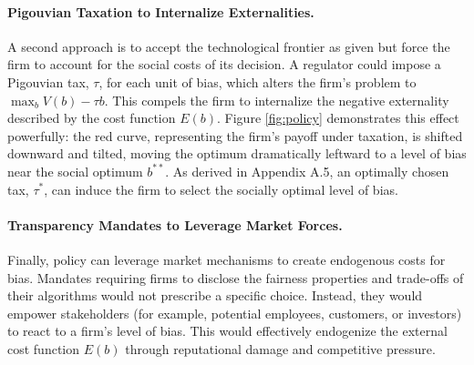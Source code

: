 \paragraph{Pigouvian Taxation to Internalize Externalities.}
A second approach is to accept the technological frontier as given but force the firm to account for the social costs of its decision. A regulator could impose a Pigouvian tax, $\tau$, for each unit of bias, which alters the firm's problem to $\max_b V(b) - \tau b$. This compels the firm to internalize the negative externality described by the cost function $E(b)$. Figure \ref{fig:policy} demonstrates this effect powerfully: the red curve, representing the firm's payoff under taxation, is shifted downward and tilted, moving the optimum dramatically leftward to a level of bias near the social optimum $b^{**}$. As derived in Appendix A.5, an optimally chosen tax, $\tau^*$, can induce the firm to select the socially optimal level of bias.

\paragraph{Transparency Mandates to Leverage Market Forces.}
Finally, policy can leverage market mechanisms to create endogenous costs for bias. Mandates requiring firms to disclose the fairness properties and trade-offs of their algorithms would not prescribe a specific choice. Instead, they would empower stakeholders (for example, potential employees, customers, or investors) to react to a firm's level of bias. This would effectively endogenize the external cost function $E(b)$ through reputational damage and competitive pressure.

